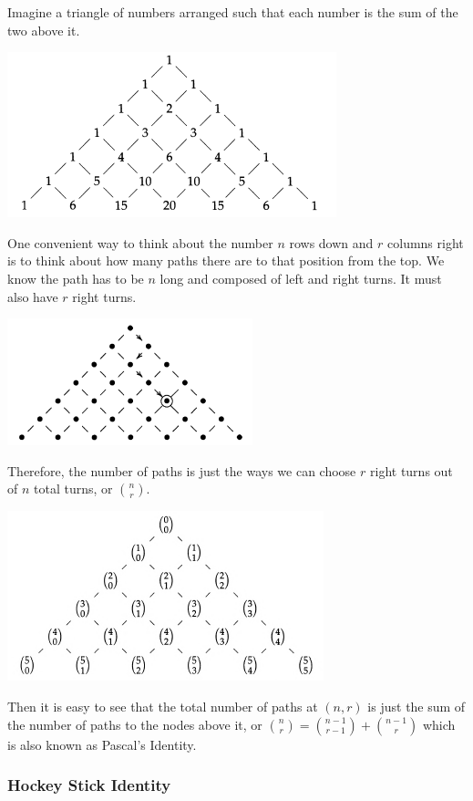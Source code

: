 \documentclass[../main.tex]{subfiles}
\begin{document}
Imagine a triangle of numbers arranged such that each number is the sum of the two above it.

\includegraphics{2.png}

One convenient way to think about the number \( n \) rows down and \( r \) columns right
is to think about how many paths there are to that position from the top.
We know the path has to be \( n \) long and composed of left and right turns.
It must also have \( r \) right turns.

\includegraphics{3.png}

Therefore, the number of paths is just the ways we can choose \( r \) right turns
out of \( n \) total turns, or \( \binom{n}{r} \).

\includegraphics{4.png}

Then it is easy to see that the total number of paths at \( (n, r) \)
is just the sum of the number of paths to the nodes above it,
or \( \binom{n}{r} = \binom{n - 1}{r - 1} + \binom{n - 1}{r} \)
which is also known as Pascal's Identity.

\subsubsection{Hockey Stick Identity}
\end{document}
